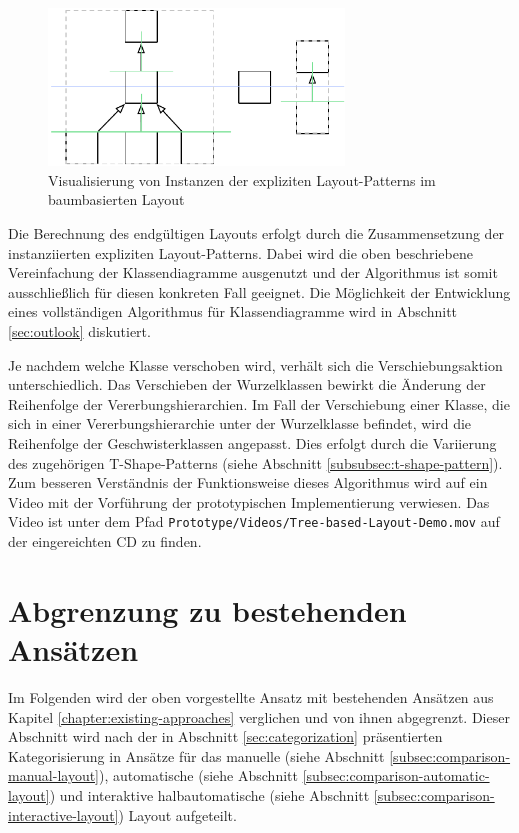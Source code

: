 \begin{figure}[hbt]
    \centering
    \includegraphics[width=0.7\textwidth]{resources/tree-based-layout}
    \caption{Visualisierung von Instanzen der expliziten Layout-Patterns im baumbasierten Layout}
    \label{fig:tree-based-layout}
\end{figure}

Die Berechnung des endgültigen Layouts erfolgt durch die Zusammensetzung der instanziierten expliziten Layout-Patterns. Dabei wird die oben beschriebene Vereinfachung der Klassendiagramme ausgenutzt und der Algorithmus ist somit ausschließlich für diesen konkreten Fall geeignet. Die Möglichkeit der Entwicklung eines vollständigen Algorithmus für Klassendiagramme wird in Abschnitt \ref{sec:outlook} diskutiert.

Je nachdem welche Klasse verschoben wird, verhält sich die Verschiebungsaktion unterschiedlich. Das Verschieben der Wurzelklassen bewirkt die Änderung der Reihenfolge der Vererbungshierarchien. Im Fall der Verschiebung einer Klasse, die sich in einer Vererbungshierarchie unter der Wurzelklasse befindet, wird die Reihenfolge der Geschwisterklassen angepasst. Dies erfolgt durch die Variierung des zugehörigen T-Shape-Patterns (siehe Abschnitt \ref{subsubsec:t-shape-pattern}). Zum besseren Verständnis der Funktionsweise dieses Algorithmus wird auf ein Video mit der Vorführung der prototypischen Implementierung verwiesen. Das Video ist unter dem Pfad \texttt{Prototype/Videos/Tree-based\--Lay\-out-\-De\-mo.mov} auf der eingereichten CD zu finden.

\section{Abgrenzung zu bestehenden Ansätzen}
\label{sec:current-approaches-comparison}

Im Folgenden wird der oben vorgestellte Ansatz mit bestehenden Ansätzen aus Kapitel \ref{chapter:existing-approaches} verglichen und von ihnen abgegrenzt. Dieser Abschnitt wird nach der in Abschnitt \ref{sec:categorization} präsentierten Kategorisierung in Ansätze für das manuelle (siehe Abschnitt \ref{subsec:comparison-manual-layout}), automatische (siehe Abschnitt \ref{subsec:comparison-automatic-layout}) und interaktive halbautomatische (siehe Abschnitt \ref{subsec:comparison-interactive-layout}) Layout aufgeteilt.

